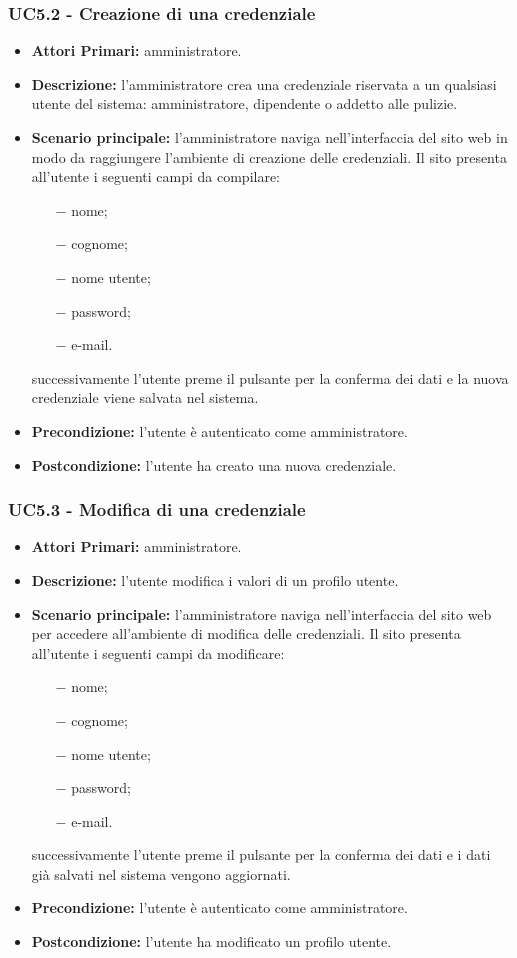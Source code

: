 \subsubsection{ UC5.2 - Creazione di una credenziale}
\begin{itemize}
	\item\textbf{Attori Primari:}
	amministratore.
	\item\textbf{Descrizione:} 
	l'amministratore crea una credenziale riservata a un qualsiasi utente del sistema: amministratore, dipendente o addetto alle pulizie.
	\item\textbf{Scenario principale:} 
	l'amministratore naviga nell'interfaccia del sito web in modo da raggiungere l'ambiente di creazione delle credenziali.
	Il sito presenta all'utente i seguenti campi da compilare:
	\begin{itemize}
		\item[$-$] nome;
		\item[$-$] cognome;
		\item[$-$] nome utente;
		\item[$-$] password;
		\item[$-$] e-mail.
	\end{itemize}
	successivamente l'utente preme il pulsante per la conferma dei dati e la nuova credenziale viene salvata nel sistema.
	\item\textbf{Precondizione:} 
	l'utente è autenticato come amministratore.
	\item\textbf{Postcondizione:}
	l'utente ha creato una nuova credenziale.
\end{itemize}

\subsubsection{ UC5.3 - Modifica di una credenziale}
\begin{itemize}
	\item\textbf{Attori Primari:} 
	amministratore.
	\item\textbf{Descrizione:} 
	l'utente modifica i valori di un profilo utente.
	\item\textbf{Scenario principale:} 
	l'amministratore naviga nell'interfaccia del sito web per accedere all'ambiente di modifica delle credenziali.
	Il sito presenta all'utente i seguenti campi da modificare:
	\begin{itemize}
		\item[$-$] nome;
		\item[$-$] cognome;
		\item[$-$] nome utente;
		\item[$-$] password;
		\item[$-$] e-mail.
	\end{itemize}
	successivamente l'utente preme il pulsante per la conferma dei dati e i dati già salvati nel sistema vengono aggiornati.
	\item\textbf{Precondizione:} 
	l'utente è autenticato come amministratore.
	\item\textbf{Postcondizione:}
	l'utente ha modificato un profilo utente.
\end{itemize}

